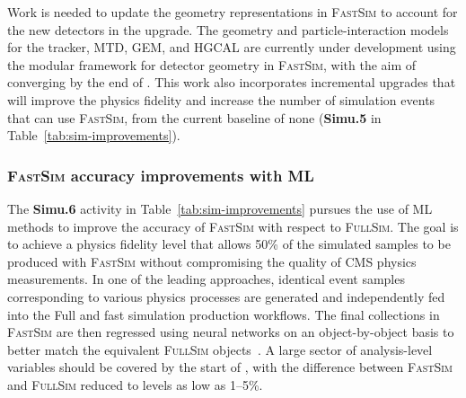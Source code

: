 Work is needed to update the geometry representations in \textsc{FastSim} to account for the new detectors in the \PhaseTwo upgrade. The geometry and particle-interaction models for the \PhaseTwo tracker, \gls{MTD}, \gls{GEM}, and \gls{HGCAL} are currently under development using the modular framework for detector geometry in \textsc{FastSim}, with the aim of converging by the end of \RunThree. This work also incorporates incremental upgrades that will improve the physics fidelity and increase the number of simulation events that can use \textsc{FastSim}, from the current \RunFour baseline of none (\textbf{Simu.5} in Table~\ref{tab:sim-improvements}).

\subsubsection{\textsc{FastSim} accuracy improvements with ML}
The \textbf{Simu.6} activity in Table~\ref{tab:sim-improvements} pursues the use of \gls{ML} methods to improve the accuracy of \textsc{FastSim} with respect to \textsc{FullSim}. The goal is to achieve a physics fidelity level that allows 50\% of the simulated samples to be produced with \textsc{FastSim} without compromising the quality of CMS physics measurements. In one of the leading approaches, identical event samples corresponding to various physics processes are generated and independently fed into the Full and fast simulation production workflows. The final collections in \textsc{FastSim} are then regressed using neural networks on an object-by-object basis to better match the equivalent \textsc{FullSim} objects~\cite{Banerjee:2022gkg,Bein:2023ylt,NIPS1987_a87ff679}. A large sector of analysis-level variables should be covered by the start of \RunFour, with the difference between \textsc{FastSim} and \textsc{FullSim} reduced to levels as low as 1--5\%.

